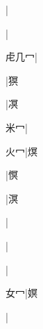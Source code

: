 \begin{multicols}{2}
{{}|{}\par
{}|{}\par
{\cjk{}虍几{\cnxHanaA{}冖}}|{}\par
{}|{\cjk{}猽}\par
{}|{\cjk{}凕}\par
{\cjk{}{\cnsym{}　}米{\cnxHanaA{}冖}}|{}\par
{\cjk{}{\cnsym{}　}火{\cnxHanaA{}冖}}|{\cjk{}熐}\par
{}|{\cjk{}慏}\par
{}|{\cjk{}溟}\par
{}|{}\par
{}|{}\par
{}|{}\par
{\cjk{}{\cnsym{}　}女{\cnxHanaA{}冖}}|{\cjk{}嫇}\par
{}|{}\par
}
\end{multicols}

